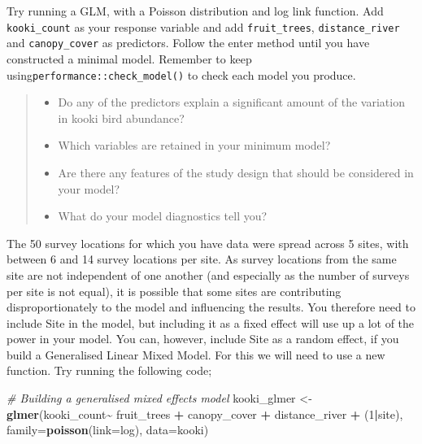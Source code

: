 \documentclass[
]{book}
\newenvironment{Shaded}{\begin{snugshade}}{\end{snugshade}}
\newcommand{\AttributeTok}[1]{\textcolor[rgb]{0.13,0.29,0.53}{#1}}
\newcommand{\CommentTok}[1]{\textcolor[rgb]{0.56,0.35,0.01}{\textit{#1}}}
\newcommand{\DecValTok}[1]{\textcolor[rgb]{0.00,0.00,0.81}{#1}}
\newcommand{\FunctionTok}[1]{\textcolor[rgb]{0.13,0.29,0.53}{\textbf{#1}}}
\newcommand{\NormalTok}[1]{#1}
\newcommand{\OtherTok}[1]{\textcolor[rgb]{0.56,0.35,0.01}{#1}}
\newcommand{\SpecialCharTok}[1]{\textcolor[rgb]{0.81,0.36,0.00}{\textbf{#1}}}
\providecommand{\tightlist}{%
  \setlength{\itemsep}{0pt}\setlength{\parskip}{0pt}}
\begin{document}
Try running a GLM, with a Poisson distribution and log link function. Add \texttt{kooki\_count} as your response variable and add \texttt{fruit\_trees}, \texttt{distance\_river} and \texttt{canopy\_cover} as predictors. Follow the enter method until you have constructed a minimal model. Remember to keep using\texttt{performance::check\_model()} to check each model you produce.

\begin{quote}
\begin{itemize}
\tightlist
\item
  Do any of the predictors explain a significant amount of the variation in kooki bird abundance?
\item
  Which variables are retained in your minimum model?
\item
  Are there any features of the study design that should be considered in your model?
\item
  What do your model diagnostics tell you?
\end{itemize}
\end{quote}

The 50 survey locations for which you have data were spread across 5 sites, with between 6 and 14 survey locations per site. As survey locations from the same site are not independent of one another (and especially as the number of surveys per site is not equal), it is possible that some sites are contributing disproportionately to the model and influencing the results. You therefore need to include Site in the model, but including it as a fixed effect will use up a lot of the power in your model. You can, however, include Site as a random effect, if you build a Generalised Linear Mixed Model. For this we will need to use a new function. Try running the following code;

\begin{Shaded}
\begin{Highlighting}[]
\CommentTok{\# Building a generalised mixed effects model}
\NormalTok{kooki\_glmer }\OtherTok{\textless{}{-}} \FunctionTok{glmer}\NormalTok{(kooki\_count}\SpecialCharTok{\textasciitilde{}}\NormalTok{ fruit\_trees }\SpecialCharTok{+}\NormalTok{ canopy\_cover }\SpecialCharTok{+}\NormalTok{ distance\_river }\SpecialCharTok{+}\NormalTok{ (}\DecValTok{1}\SpecialCharTok{|}\NormalTok{site), }\AttributeTok{family=}\FunctionTok{poisson}\NormalTok{(}\AttributeTok{link=}\NormalTok{log), }\AttributeTok{data=}\NormalTok{kooki)}
\end{Highlighting}
\end{Shaded}
\end{document}
